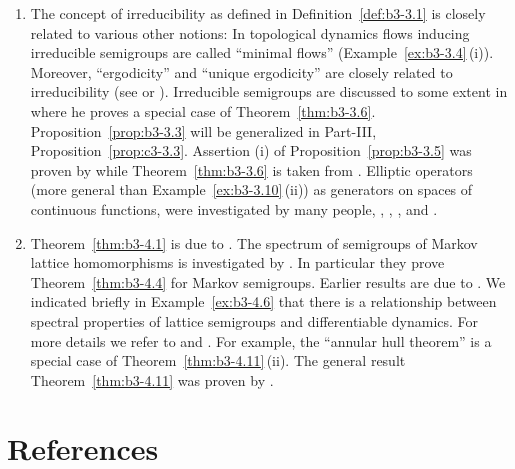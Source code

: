 \begin{enumerate}[label=\emph{Section 3.\arabic*:}, wide]
\item
The concept of irreducibility as defined in Definition~\ref{def:b3-3.1} is closely related to various other notions:
In topological dynamics flows inducing irreducible semigroups are called \enquote{minimal flows} (\cf Example~\ref{ex:b3-3.4}\,(i)).
Moreover, \enquote{ergodicity} and \enquote{unique ergodicity} are closely related to irreducibility (see \textcite{cornfeldetal:1982} or \textcite{krengel:1985}).
Irreducible semigroups are discussed to some extent in \textcite{davies:1980} where he proves a special case of Theorem~\ref{thm:b3-3.6}.
Proposition~\ref{prop:b3-3.3} will be generalized in Part-III, Proposition~\ref{prop:c3-3.3}.
Assertion (i) of Proposition~\ref{prop:b3-3.5} was proven by \textcite{schaefer:1982} while Theorem~\ref{thm:b3-3.6} is taken from \textcite{greiner:1982}.
Elliptic operators (more general than Example~\ref{ex:b3-3.10}\,(ii)) as generators on spaces of continuous functions, were investigated by many people, \eg \textcite{bonyetal:1968}, \textcite{kuhn:1984}, \textcite{roth:1976}, \textcite{roth:1978} and \textcite{stewart:1974}.

\item
Theorem~\ref{thm:b3-4.1} is due to \textcite{derndinger:1984}.
The spectrum of semigroups of Markov lattice homomorphisms is investigated by \textcite{derndingernagel:1979}.
In particular they prove Theorem~\ref{thm:b3-4.4} for Markov semigroups.
Earlier results are due to \textcite{scarpellini:1974}.
We indicated briefly in Example~\ref{ex:b3-4.6} that there is a relationship between spectral properties of lattice semigroups and differentiable dynamics.
For more details we refer to \textcite{chiconeswanson:1981} and \textcite{sackersell:1978}.
For example, the \enquote{annular hull theorem} is a special case of Theorem~\ref{thm:b3-4.11}\,(ii).
The general result Theorem~\ref{thm:b3-4.11} was proven by \textcite{arendtgreiner:1984}.

\end{enumerate}
\section*{References}
{\RaggedRight
  \printbibliography[heading=none]
 }
 
 